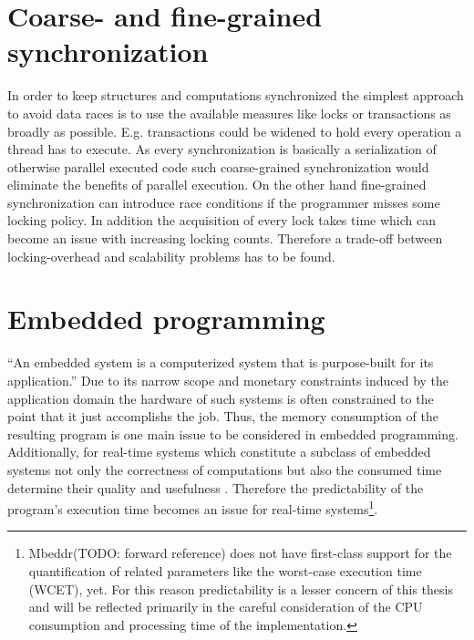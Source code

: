 \section{Coarse- and fine-grained synchronization}
In order to keep structures and computations synchronized the simplest approach to avoid data races is to use the available measures like locks or transactions as broadly as possible. E.g. transactions could be widened to hold every operation a thread has to execute. As every synchronization is basically a serialization of otherwise parallel executed code such coarse-grained synchronization would eliminate the benefits of parallel execution. On the other hand fine-grained synchronization can introduce race conditions if the programmer misses some locking policy. In addition the acquisition of every lock takes time which can become an issue with increasing locking counts. Therefore a trade-off between locking-overhead and scalability problems has to be found\cite[pp.~1-2]{PrinciplesOfTransactionalMemory}.

\section{Embedded programming}
``An embedded system is a computerized system that is purpose-built for its application.''\cite[p.~1]{MakingEmbeddedSystems} Due to its narrow scope and monetary constraints induced by the application domain the hardware of such systems is often constrained to the point that it just accomplishs the job\cite{MakingEmbeddedSystems}. Thus, the memory consumption of the resulting program is one main issue to be considered in embedded programming. Additionally, for real-time systems which constitute a subclass of embedded systems not only the correctness of computations but also the consumed time determine their quality and usefulness \cite[pp.~1-2]{SoftReal-TimeSystems}. Therefore the predictability of the program's execution time becomes an issue for real-time systems\footnote{Mbeddr(TODO: forward reference) does not have first-class support for the quantification of related parameters like the worst-case execution time (WCET)\cite[p.~8]{SoftReal-TimeSystems}, yet. For this reason predictability is a lesser concern of this thesis and will be reflected primarily in the careful consideration of the CPU consumption and processing time of the implementation.}.

